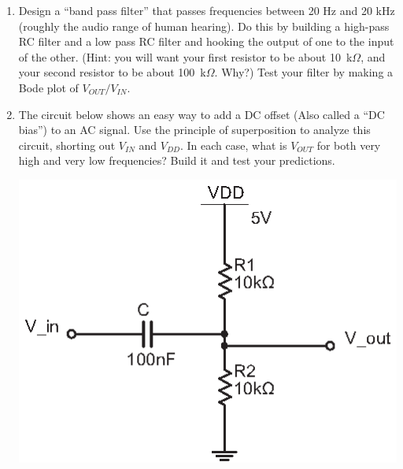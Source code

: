 \begin{enumerate}[wide]
\item Design a ``band pass filter'' that passes frequencies between 20 Hz and 20 kHz (roughly the audio range of human hearing).  Do this by building a high-pass RC filter and a low pass RC filter and hooking the output of one to the input of the other.  (Hint: you will want your first resistor to be about 10~k$\Omega$, and your second resistor to be about 100~k$\Omega$.  Why?)   Test your filter by making a Bode plot of $V_{OUT}/V_{IN}$.\label{part_band_pass_filter}



\item The circuit below shows an easy way to add a DC offset (Also called a ``DC bias'') to an AC signal.  Use the principle of superposition to analyze this circuit, shorting out $V_{IN}$ and $V_{DD}$.  In each case, what is $V_{OUT}$ for both very high and very low frequencies?  Build it and test your predictions. \label{part_DC_bias}
\begin{center}
\includegraphics{filters/DC_biasing.eps}
\end{center}


\end{enumerate}
